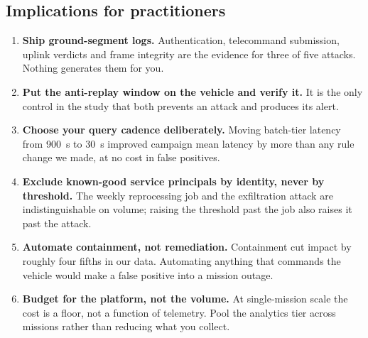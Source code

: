 \subsection{Implications for practitioners}

\begin{enumerate}
\item \textbf{Ship ground-segment logs.} Authentication, telecommand submission,
uplink verdicts and frame integrity are the evidence for three of five attacks.
Nothing generates them for you.
\item \textbf{Put the anti-replay window on the vehicle and verify it.} It is the
only control in the study that both prevents an attack and produces its alert.
\item \textbf{Choose your query cadence deliberately.} Moving batch-tier latency
from \SI{900}{\second} to \SI{30}{\second} improved campaign mean latency by more
than any rule change we made, at no cost in false positives.
\item \textbf{Exclude known-good service principals by identity, never by
threshold.} The weekly reprocessing job and the exfiltration attack are
indistinguishable on volume; raising the threshold past the job also raises it
past the attack.
\item \textbf{Automate containment, not remediation.} Containment cut impact by
roughly four fifths in our data. Automating anything that commands the vehicle
would make a false positive into a mission outage.
\item \textbf{Budget for the platform, not the volume.} At single-mission scale
the cost is a floor, not a function of telemetry. Pool the analytics tier across
missions rather than reducing what you collect.
\end{enumerate}
